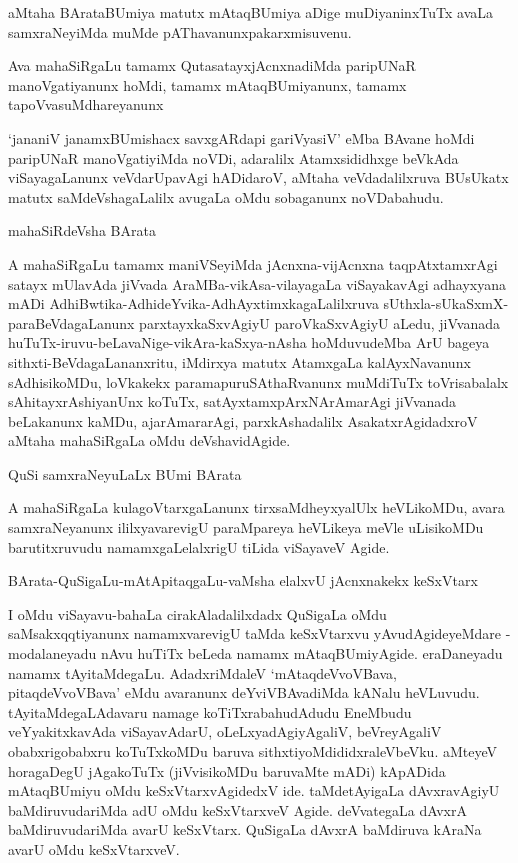 aMtaha BArataBUmiya matutx mAtaqBUmiya aDige muDiyaninxTuTx avaLa samxraNeyiMda muMde pAThavanunxpakarxmisuvenu.

Ava mahaSiRgaLu tamamx QutasatayxjAcnxnadiMda paripUNaR manoVgatiyanunx hoMdi, tamamx mAtaqBUmiyanunx, tamamx tapoVvasuMdhareyanunx 

`jananiV janamxBUmishacx savxgARdapi gariVyasiV' eMba BAvane hoMdi paripUNaR manoVgatiyiMda noVDi, adaralilx Atamxsididhxge beVkAda viSayagaLanunx veVdarUpavAgi hADidaroV, aMtaha veVdadalilxruva BUsUkatx matutx saMdeVshagaLalilx avugaLa oMdu sobaganunx noVDabahudu.

mahaSiRdeVsha BArata

A mahaSiRgaLu tamamx maniVSeyiMda jAcnxna-vijAcnxna taqpAtxtamxrAgi satayx mUlavAda jiVvada AraMBa-vikAsa-vilayagaLa viSayakavAgi adhayxyana mADi AdhiBwtika-AdhideYvika-AdhAyxtimxkagaLalilxruva sUthxla-sUkaSxmX-paraBeVdagaLanunx parxtayxkaSxvAgiyU paroVkaSxvAgiyU aLedu, jiVvanada huTuTx-iruvu-beLavaNige-vikAra-kaSxya-nAsha hoMduvudeMba ArU bageya sithxti-BeVdagaLananxritu, iMdirxya matutx AtamxgaLa kalAyxNavanunx sAdhisikoMDu, loVkakekx paramapuruSAthaRvanunx muMdiTuTx toVrisabalalx sAhitayxrAshiyanUnx koTuTx, satAyxtamxpArxNArAmarAgi jiVvanada beLakanunx kaMDu, ajarAmararAgi, parxkAshadalilx AsakatxrAgidadxroV aMtaha mahaSiRgaLa oMdu deVshavidAgide.

QuSi samxraNeyuLaLx BUmi BArata

A mahaSiRgaLa kulagoVtarxgaLanunx tirxsaMdheyxyalUlx heVLikoMDu, avara samxraNeyanunx ililxyavarevigU paraMpareya heVLikeya meVle uLisikoMDu barutitxruvudu namamxgaLelalxrigU tiLida viSayaveV Agide.

BArata-QuSigaLu-mAtApitaqgaLu-vaMsha elalxvU jAcnxnakekx keSxVtarx

I oMdu viSayavu-bahaLa cirakAladalilxdadx QuSigaLa oMdu saMsakxqqtiyanunx namamxvarevigU taMda keSxVtarxvu yAvudAgideyeMdare - modalaneyadu nAvu huTiTx beLeda namamx mAtaqBUmiyAgide. eraDaneyadu namamx tAyitaMdegaLu. AdadxriMdaleV `mAtaqdeVvoVBava, pitaqdeVvoVBava' eMdu avaranunx deYviVBAvadiMda kANalu heVLuvudu. tAyitaMdegaLAdavaru namage koTiTxrabahudAdudu EneMbudu veYyakitxkavAda viSayavAdarU, oLeLxyadAgiyAgaliV, beVreyAgaliV obabxrigobabxru koTuTxkoMDu baruva sithxtiyoMdididxraleVbeVku. aMteyeV horagaDegU jAgakoTuTx (jiVvisikoMDu baruvaMte mADi) kApADida mAtaqBUmiyu oMdu keSxVtarxvAgidedxV ide. taMdetAyigaLa dAvxravAgiyU baMdiruvudariMda adU oMdu keSxVtarxveV Agide. deVvategaLa dAvxrA baMdiruvudariMda avarU keSxVtarx. QuSigaLa dAvxrA baMdiruva kAraNa avarU oMdu keSxVtarxveV.

